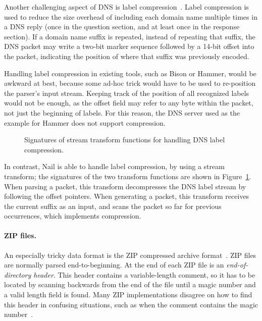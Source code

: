 Another challenging aspect of DNS is label
compression~\cite[\S4.1.4]{RFC:1035}.  Label compression is used to reduce
the size overhead of including each domain name multiple times in a DNS
reply (once in the question section, and at least once in the response
section).  If a domain name suffix is repeated, instead of repeating that
suffix, the DNS packet may write a two-bit marker sequence followed by
a 14-bit offset into the packet, indicating the position of where that
suffix was previously encoded.


Handling label compression in existing tools, such as Bison or Hammer,
would be awkward at best, because some ad-hoc trick would have to
be used to re-position the parser's input stream.  Keeping track of the
position of all recognized labels would not be enough, as the offset field
may refer to any byte within the packet, not just the beginning of labels.
For this reason, the DNS server used as the example for Hammer does not
support compression.

\begin{figure}
\smaller[0.5]

\caption{Signatures of stream transform functions for handling DNS label compression.}
\label{fig:dns-xform}
\end{figure}

In contrast, Nail is able to handle label compression, by using a stream
transform; the signatures of the two transform functions are shown
in Figure~\ref{fig:dns-xform}.  When parsing a packet, this transform
decompresses the DNS label stream by following the offset pointers.
When generating a packet, this transform receives the current suffix as
an input, and scans the packet so far for previous occurrences, which
implements compression.


\paragraph{ZIP files.}

An especially tricky data format is the ZIP compressed archive
format~\cite{pkzip}.  ZIP files are normally parsed end-to-beginning. At
the end of each ZIP file is an \emph{end-of-directory header}. This header
contains a variable-length comment, so it has to be located by scanning
backwards from the end of the file until a magic number and a valid
length field is found. Many ZIP implementations disagree on how to find
this header in confusing situations, such as when the comment contains
the magic number~\cite{wolf:berlinsides-zip}. 

